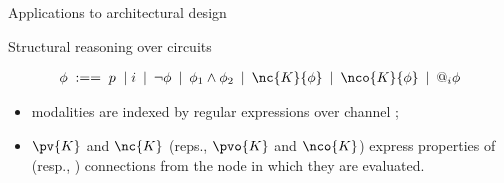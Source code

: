 \documentclass{beamer}
\begin{document}
\begin{slide}{Applications to architectural design}\label{s:52}
\small

\begin{block}{Structural reasoning over \reo circuits}

$$
\begin{array}{c}
\phi\; :== \; p\; \mid i \: \mid\: \neg \phi \: \mid\: \phi_1 \land \phi_2\:  \mid\: \nc{K}{\phi} \:   \mid\:  \nco{K}{\phi} \:  \mid \: @_i \phi
\end{array}
$$
\begin{itemize}
\item modalities are indexed by regular expressions over channel ;
\item $\pv{K}$ and $\nc{K}$ (reps., $\pvo{K}$ and $\nco{K}$) express properties of  (resp., ) connections from the node in which they are evaluated.
\end{itemize}
\end{block}
\begin{flushright}
\end{flushright}
\end{slide}
\end{document}
